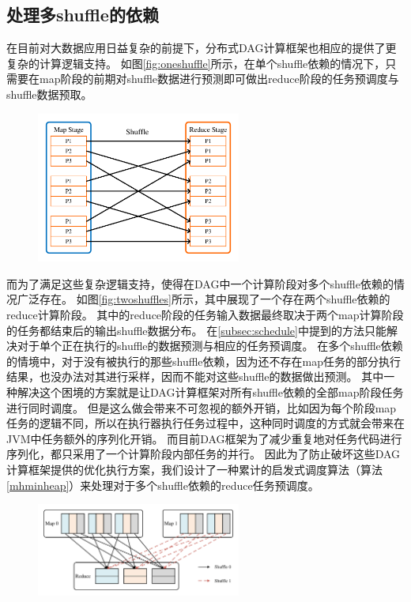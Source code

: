 \subsection{处理多shuffle的依赖}

在目前对大数据应用日益复杂的前提下，分布式DAG计算框架也相应的提供了更复杂的计算逻辑支持。
如图\ref{fig:oneshuffle}所示，在单个shuffle依赖的情况下，只需要在map阶段的前期对shuffle数据进行预测即可做出reduce阶段的任务预调度与shuffle数据预取。

\begin{figure}[!htp]
    \centering
    \includegraphics[width=0.6\textwidth]{../figure/oneshuffle.pdf}
\end{figure}

而为了满足这些复杂逻辑支持，使得在DAG中一个计算阶段对多个shuffle依赖的情况广泛存在。
如图\ref{fig:twoshuffles}所示，其中展现了一个存在两个shuffle依赖的reduce计算阶段。
其中的reduce阶段的任务输入数据最终取决于两个map计算阶段的任务都结束后的输出shuffle数据分布。
在\ref{subsec:schedule}中提到的方法只能解决对于单个正在执行的shuffle的数据预测与相应的任务预调度。
在多个shuffle依赖的情境中，对于没有被执行的那些shuffle依赖，因为还不存在map任务的部分执行结果，也没办法对其进行采样，因而不能对这些shuffle的数据做出预测。
其中一种解决这个困境的方案就是让DAG计算框架对所有shuffle依赖的全部map阶段任务进行同时调度。
但是这么做会带来不可忽视的额外开销，比如因为每个阶段map任务的逻辑不同，所以在执行器执行任务过程中，这种同时调度的方式就会带来在JVM中任务额外的序列化开销。
而目前DAG框架为了减少重复地对任务代码进行序列化，都只采用了一个计算阶段内部任务的并行。
因此为了防止破坏这些DAG计算框架提供的优化执行方案，我们设计了一种累计的启发式调度算法（算法\ref{mhminheap}）来处理对于多个shuffle依赖的reduce任务预调度。

\begin{figure}[!htp]
    \centering
    \includegraphics[width=0.6\textwidth]{../figure/twoshuffles.pdf}
\end{figure}

